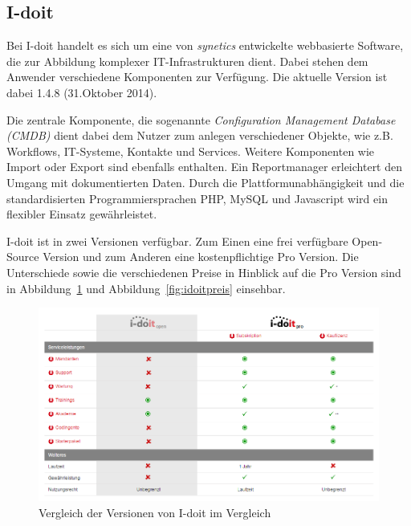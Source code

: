 
\subsection{I-doit}

Bei I-doit handelt es sich um eine von \textit{synetics} entwickelte webbasierte Software, die zur Abbildung komplexer IT-Infrastrukturen dient.
Dabei stehen dem Anwender verschiedene Komponenten zur Verfügung. 
Die aktuelle Version ist dabei 1.4.8 (31.Oktober 2014). 

Die zentrale Komponente, die sogenannte \textit{Configuration Management Database (CMDB)} dient dabei dem Nutzer zum anlegen verschiedener Objekte, wie z.B. Workflows, IT-Systeme, Kontakte und Services.
Weitere Komponenten wie Import oder Export sind ebenfalls enthalten.
Ein Reportmanager erleichtert den Umgang mit dokumentierten Daten. 
Durch die Plattformunabhängigkeit und die standardisierten Programmiersprachen PHP, MySQL und Javascript wird ein flexibler Einsatz gewährleistet.

I-doit ist in zwei Versionen verfügbar. Zum Einen eine frei verfügbare Open-Source Version und zum Anderen eine kostenpflichtige Pro Version.
Die Unterschiede sowie die verschiedenen Preise in Hinblick auf die Pro Version sind in Abbildung~\ref{fig:idoitvergleich} und Abbildung~\ref{fig:idoitpreis} einsehbar.

\begin{figure}[htbp]
\includegraphics[width=\textwidth]{images/idoitvergleich}
\caption{Vergleich der Versionen von I-doit im Vergleich}
\label{fig:idoitvergleich}
\end{figure}

